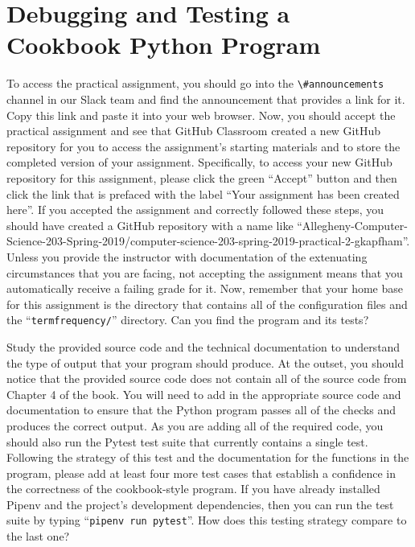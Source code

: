 \documentclass[11pt]{article}
\newcommand{\command}[1]{``\lstinline{#1}''}
\newcommand{\channel}[1]{\lstinline{#1}}
\begin{document}
\section*{Debugging and Testing a Cookbook Python Program}

To access the practical assignment, you should go into the
\channel{\#announcements} channel in our Slack team and find the announcement
that provides a link for it. Copy this link and paste it into your web browser.
Now, you should accept the practical assignment and see that GitHub Classroom
created a new GitHub repository for you to access the assignment's starting
materials and to store the completed version of your assignment. Specifically,
to access your new GitHub repository for this assignment, please click the green
``Accept'' button and then click the link that is prefaced with the label ``Your
assignment has been created here''. If you accepted the assignment and correctly
followed these steps, you should have created a GitHub repository with a name
like
``Allegheny-Computer-Science-203-Spring-2019/computer-science-203-spring-2019-practical-2-gkapfham''.
Unless you provide the instructor with documentation of the extenuating
circumstances that you are facing, not accepting the assignment means that you
automatically receive a failing grade for it. Now, remember that your home base
for this assignment is the directory that contains all of the configuration
files and the \command{termfrequency/} directory. Can you find the program and
its tests?


Study the provided source code and the technical documentation to understand the
type of output that your program should produce.
%
At the outset, you should notice that the provided source code does not contain
all of the source code from Chapter 4 of the book. You will need to add in the
appropriate source code and documentation to ensure that the Python program
passes all of the checks and produces the correct output.
%
As you are adding all of the required code, you should also run the Pytest test
suite that currently contains a single test. Following the strategy of this test
and the documentation for the functions in the program, please add at least four
more test cases that establish a confidence in the correctness of the
cookbook-style program. If you have already installed Pipenv and the project's
development dependencies, then you can run the test suite by typing
\command{pipenv run pytest}. How does this testing strategy compare to the last
one?
\end{document}
